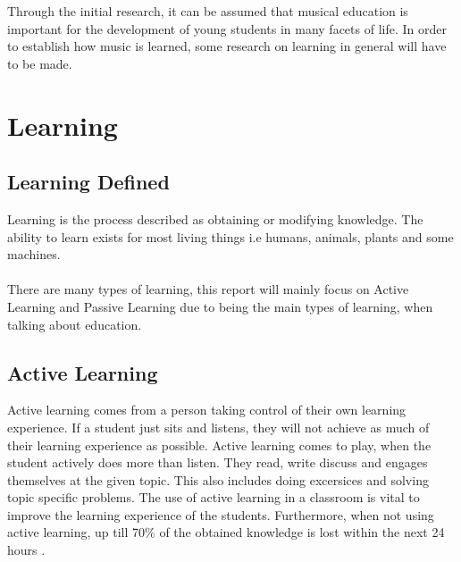 Through the initial research, it can be assumed that musical education is important for the development of young students in many facets of life. In order to establish how music is learned, some research on learning in general will have to be made.

\section{Learning}
\subsection{Learning Defined}\label{sec:learning}
Learning is the process described as obtaining or modifying knowledge. The ability to learn exists for most living things i.e humans, animals, plants and some machines. \\
\\
There are many types of learning,
this report will mainly focus on Active Learning and Passive Learning due to being the main types of learning, when talking about education.

\subsection*{Active Learning}\label{sec:activeLearning}
Active learning comes from a person taking control of their own learning experience. If a student just sits and listens, they will not achieve as much of their learning experience as possible. Active learning comes to play, when the student actively does more than listen. They read, write discuss and engages themselves at the given topic. This also includes doing excersices and solving topic specific problems\cite{activelearning}. The use of active learning in a classroom is vital to improve the learning experience of the students. Furthermore, when not using active learning, up till 70\% of the obtained knowledge is lost within the next 24 hours \cite{learning}.\\


